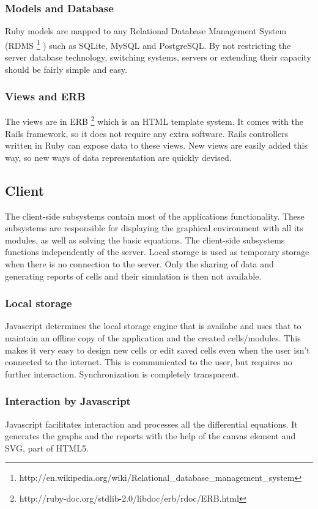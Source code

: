 \documentclass{report}
\begin{document}
				\subsubsection{Models and Database}
					Ruby models are mapped to any Relational Database Management System (RDMS \footnote{http://en.wikipedia.org/wiki/Relational\_database\_management\_system} ) such as SQLite, MySQL and PostgreSQL. By not restricting the server database technology, switching systems, servers or extending  their capacity should be fairly simple and easy.
					\newpage
				\subsubsection{Views and ERB} 
					The views are in ERB \footnote{http://ruby-doc.org/stdlib-2.0/libdoc/erb/rdoc/ERB.html} which is an HTML template system. It comes with the Rails framework, so it does not require any extra software. Rails controllers written in Ruby can expose data to these views. New views are easily added this way, so new ways of data representation are quickly devised.
			\newpage

			\subsection{Client}
				The client-side subsystems contain most of the applications functionality. These subsystems are responsible for displaying the graphical environment with all its modules, as well as solving the basic equations.  The client-side subsystems functions independently of the server. Local storage is used as temporary storage when there is no connection to the server. Only the sharing of data and generating reports of cells and their simulation is then not available.
				\subsubsection{Local storage}
					Javascript determines the local storage engine that is availabe and uses that to maintain an offline copy of the application and the created cells/modules. This makes it very easy to design new cells or edit saved cells even when the user isn't connected to the internet. This is communicated to the user, but requires no further interaction. Synchronization is completely transparent.
				\subsubsection{Interaction by Javascript}
					Javascript facilitates interaction and processes all the differential equations. It generates the graphs and the reports with the help of the canvas element and SVG, part of HTML5.
		
\end{document}
